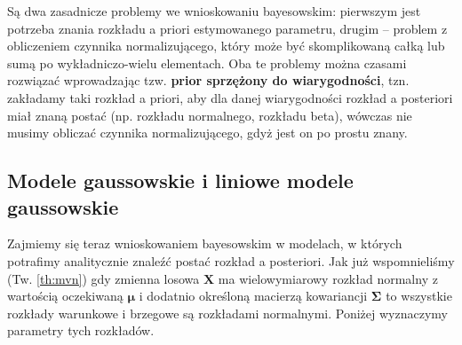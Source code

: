 \documentclass{myclass}
\numberwithin{equation}{subsection}
\begin{document}
Są dwa zasadnicze problemy we wnioskowaniu bayesowskim: pierwszym jest potrzeba znania rozkładu a
priori estymowanego parametru, drugim -- problem z obliczeniem czynnika normalizującego, który może
być skomplikowaną całką lub sumą po wykładniczo-wielu elementach. Oba te problemy można czasami
rozwiązać wprowadzając tzw. \textbf{prior sprzężony do wiarygodności}, tzn. zakładamy taki rozkład a
priori, aby dla danej wiarygodności rozkład a posteriori miał znaną postać (np. rozkładu normalnego,
rozkładu beta), wówczas nie musimy obliczać czynnika normalizującego, gdyż jest on po prostu znany.


\subsection{Modele gaussowskie i liniowe modele gaussowskie}

Zajmiemy się teraz wnioskowaniem bayesowskim w modelach, w których potrafimy analitycznie znaleźć
postać rozkład a posteriori. Jak już wspomnieliśmy (Tw. \ref{th:mvn}) gdy zmienna losowa
\(\mathbf{X}\) ma wielowymiarowy rozkład normalny z wartością oczekiwaną \(\boldsymbol{\mu}\) i
dodatnio określoną macierzą kowariancji \(\boldsymbol{\Sigma}\) to wszystkie rozkłady warunkowe i
brzegowe są rozkładami normalnymi. Poniżej wyznaczymy parametry tych rozkładów.
\end{document}
